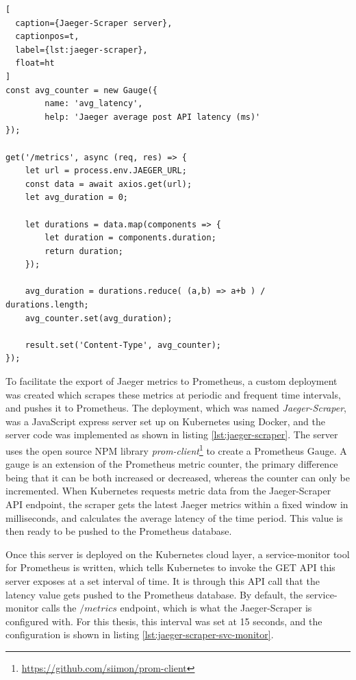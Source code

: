 \begin{lstlisting}[
  caption={Jaeger-Scraper server},
  captionpos=t,
  label={lst:jaeger-scraper},
  float=ht
]
const avg_counter = new Gauge({
        name: 'avg_latency',
        help: 'Jaeger average post API latency (ms)'
});

get('/metrics', async (req, res) => {
    let url = process.env.JAEGER_URL;
    const data = await axios.get(url);
    let avg_duration = 0;

    let durations = data.map(components => {
        let duration = components.duration;
        return duration;
    });

    avg_duration = durations.reduce( (a,b) => a+b ) / durations.length;
    avg_counter.set(avg_duration);

    result.set('Content-Type', avg_counter);
});
\end{lstlisting}

To facilitate the export of Jaeger metrics to Prometheus, a custom deployment was created which scrapes these metrics at periodic and frequent time intervals, and pushes it to Prometheus. The deployment, which was named \textit{Jaeger-Scraper}, was a JavaScript express server set up on Kubernetes using Docker, and the server code was implemented as shown in listing \ref{lst:jaeger-scraper}. The server uses the open source NPM library \textit{prom-client}\footnote{\url{https://github.com/siimon/prom-client}} to create a Prometheus Gauge. A gauge is an extension of the Prometheus metric counter, the primary difference being that it can be both increased or decreased, whereas the counter can only be incremented. When Kubernetes requests metric data from the Jaeger-Scraper API endpoint, the scraper gets the latest Jaeger metrics within a fixed window in milliseconds, and calculates the average latency of the time period. This value is then ready to be pushed to the Prometheus database.

Once this server is deployed on the Kubernetes cloud layer, a service-monitor tool for Prometheus is written, which tells Kubernetes to invoke the GET API this server exposes at a set interval of time. It is through this API call that the latency value gets pushed to the Prometheus database. By default, the service-monitor calls the $/metrics$ endpoint, which is what the Jaeger-Scraper is configured with. For this thesis, this interval was set at 15 seconds, and the configuration is shown in listing \ref{lst:jaeger-scraper-svc-monitor}.

